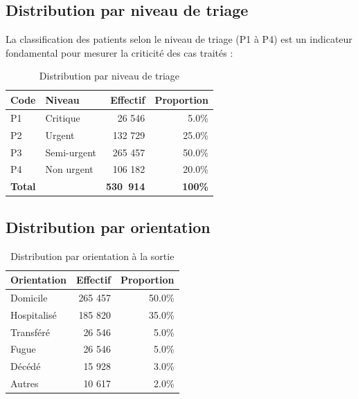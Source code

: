 \documentclass[12pt,a4paper]{report}
\begin{document}
	\subsection{Distribution par niveau de triage}
	
	La classification des patients selon le niveau de triage (P1 à P4) est un indicateur
	fondamental pour mesurer la criticité des cas traités :
	
	\begin{table}[H]
		\centering
		\caption{Distribution par niveau de triage}
		\begin{tabular}{llrr}
			\toprule
			\textbf{Code} & \textbf{Niveau} & \textbf{Effectif} & \textbf{Proportion} \\
			\midrule
			P1 & Critique      & ~26 546  & 5.0\%  \\
			P2 & Urgent        & ~132 729 & 25.0\% \\
			P3 & Semi-urgent   & ~265 457 & 50.0\% \\
			P4 & Non urgent    & ~106 182 & 20.0\% \\
			\midrule
			\multicolumn{2}{l}{\textbf{Total}} & \textbf{530~914} & \textbf{100\%} \\
			\bottomrule
		\end{tabular}
	\end{table}
	
	\subsection{Distribution par orientation}
	
	\begin{table}[H]
		\centering
		\caption{Distribution par orientation à la sortie}
		\begin{tabular}{lrr}
			\toprule
			\textbf{Orientation} & \textbf{Effectif} & \textbf{Proportion} \\
			\midrule
			Domicile        & 265 457 & 50.0\% \\
			Hospitalisé     & 185 820 & 35.0\% \\
			Transféré       &  26 546 & 5.0\%  \\
			Fugue           &  26 546 & 5.0\%  \\
			Décédé          &  15 928 & 3.0\%  \\
			Autres          &  10 617 & 2.0\%  \\
			\bottomrule
		\end{tabular}
	\end{table}
	
\end{document}
